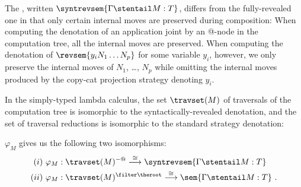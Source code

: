 The , written
$\syntrevsem{\Gamma \stentail M : T}$, differs from the
fully-revealed one in that only certain internal moves are preserved
during composition: When computing the denotation of an application
joint by an @-node in the computation tree, all the internal moves
are preserved. When computing the denotation of $\revsem{y_i N_1
\ldots N_p}$ for some variable $y_i$, however, we only preserve the
internal moves of $N_1$, \ldots, $N_p$ while omitting the internal
moves produced by the copy-cat projection strategy denoting $y_i$.


In the simply-typed lambda calculus, the set $\travset(M)$ of
traversals of the computation tree is isomorphic to the
syntactically-revealed denotation, and the set of traversal
reductions is isomorphic to the standard strategy denotation:
\begin{theorem}
\label{thm:correspondence} $\varphi_M$ gives us the following two
isomorphisms:
\begin{eqnarray*}
(i)~\varphi_M  &: \travset(M)^{-@} \stackrel{\cong}{\longrightarrow} \syntrevsem{\Gamma \stentail M :T} \\
(ii)~\varphi_M  &: \travset(M )^{\filter \theroot} \stackrel{\cong}{\longrightarrow} \sem{\Gamma \stentail M : T} \ .
\end{eqnarray*}
\end{theorem}
\bigskip

